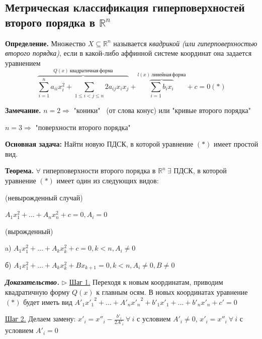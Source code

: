 \subsection{Метрическая классификация гиперповерхностей второго порядка в $\mathbb{R}^n$}

\textbf{Определение.} Множество $X \subseteq \mathbb{R}^n$ называется \textit{квадрикой (или гиперповерхностью второго порядка)}, если в какой-либо аффинной системе координат она задается уравнением \begin{equation*}\overbrace{\sum\limits_{i=1}^n a_{ii} x_i^2 + \sum\limits_{1 \leqslant i < j \leqslant n} 2 a_{ij} x_i x_j}^{Q(x) \ квадратичная \ форма} + \overbrace{\sum\limits_{i=1} b_i x_i}^{l(x) \ линейная \ форма} + c = 0 (*)\end{equation*}

\vspace{\baselineskip}
\textbf{Замечание.} $n = 2 \Rightarrow$ "коники" \ (от слова конус) или "кривые второго порядка"

$n = 3 \Rightarrow$ "поверхности второго порядка"

\vspace{\baselineskip}
\textbf{Основная задача:} Найти новую ПДСК, в которой уравнение $(*)$ имеет простой вид.

\vspace{\baselineskip}
\textbf{Теорема.} $\forall$ гиперповерхности второго порядка в $\mathbb{R}^n \ \exists$ ПДСК, в которой уравнение $(*)$ имеет один из следующих видов:

\vspace{\baselineskip}
 (невырожденный случай)

$A_1 x_1^2 + \dots + A_n x_n^2 + c = 0, A_i = 0$

\vspace{\baselineskip}
 (вырожденный)

a) $A_1 x_1^2 + \dots + A_k x_k^2 + c = 0, k < n, A_i \neq 0$

б) $A_1 x_1^2 + \dots + A_k x_k^2 + B x_{k+1} = 0, k < n, A_i \neq 0, B \neq 0$

\vspace{\baselineskip}
\textbf{\textit{Доказательство.}} $\rhd$ \underline{Шаг 1.} Переходя к новым координатам, приводим квадратичную форму $Q(x)$ к главным осям. В новых координатах уравнение $(*)$ будет иметь вид $A'_1 {x'_1}^2 + \dots + A'_n {x'_n}^2 + b'_1 x'_1 + \dots + b'_n x'_n + c' = 0$

\underline{Шаг 2.} Делаем замену: $x'_i = x''_i - \frac{b'_i}{2A'_i} \ \forall \ i$ с условием $A'_i \neq 0$, $x'_i = x''_i \ \forall \ i$ с условием $A'_i = 0$


